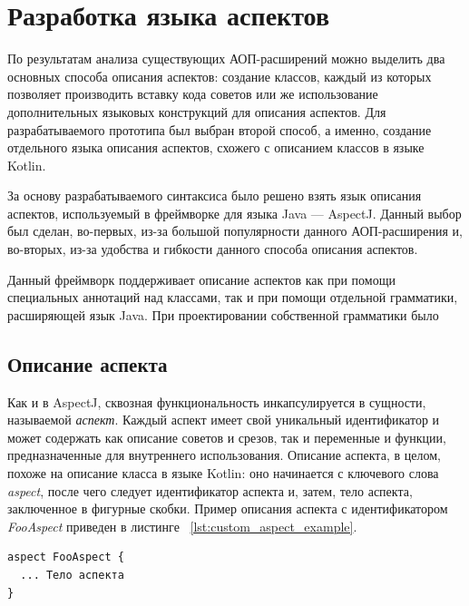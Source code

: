 \section{Разработка языка аспектов}
\label{sec:aspect_syntax_design}
По результатам анализа существующих АОП-расширений можно выделить два основных
способа описания аспектов: создание классов, каждый из которых позволяет
производить вставку кода советов или же использование дополнительных языковых конструкций для описания аспектов.
Для разрабатываемого прототипа был выбран второй способ, а именно, создание
отдельного языка описания аспектов, схожего с описанием классов в языке
Kotlin.

За основу разрабатываемого синтаксиса было решено взять язык описания аспектов,
используемый в фреймворке для языка Java --- AspectJ.
Данный выбор был сделан, во-первых, из-за большой популярности данного
АОП-расширения и, во-вторых, из-за удобства и гибкости данного способа описания
аспектов.

Данный фреймворк поддерживает описание аспектов как при помощи специальных аннотаций над классами, так и при помощи отдельной грамматики, расширяющей язык Java.
При проектировании собственной грамматики было 
\subsection{Описание аспекта}
\label{sub:custom_aspect_syntax}
Как и в AspectJ, сквозная функциональность инкапсулируется в сущности,
называемой \textit{аспект}.
Каждый аспект имеет свой уникальный идентификатор и может содержать как описание
советов и срезов, так и переменные и функции, предназначенные для внутреннего
использования.
Описание аспекта, в целом, похоже на описание класса в языке Kotlin: оно
начинается с ключевого слова \textit{aspect}, после чего следует идентификатор
аспекта и, затем, тело аспекта, заключенное в фигурные скобки.
Пример описания аспекта с идентификатором \textit{FooAspect} приведен в листинге
~\ref{lst:custom_aspect_example}.
  \begin{lstlisting}[style={java}, label={lst:custom_aspect_example}, 
  caption={Пример описания аспекта в разрабатываемом прототипе}]
aspect FooAspect {
  ... Тело аспекта
}
  \end{lstlisting}
